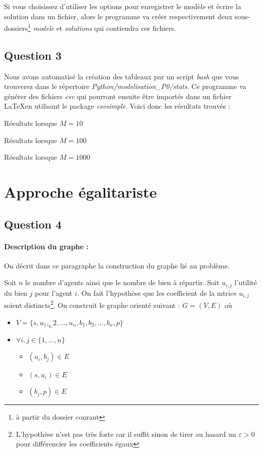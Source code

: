 \documentclass[a4paper, titlepage, oneside, 12pt]{article}%
\begin{document}
Si vous choisissez d'utiliser les options pour enregistrer le modèle et écrire la solution dans un fichier, alors le programme va créer respectivement deux sous-dossiers\footnote{à partir du dossier courant} \textit{modele} et \textit{solutions} qui contiendra ces fichiers.

\subsection{Question 3}

Nous avons automatisé la création des tableaux par un script \textit{bash} que vous trouverez dans le répertoire \textit{Python/modelisation\_P0/stats}. Ce programme va générer des fichiers \textit{csv} qui pourront ensuite être importés dans un fichier \LaTeX en utilisant le package \textit{csvsimple}. Voici donc les résultats trouvés :

\begin{table}
\caption{Résultats lorsque $M=10$}
\end{table}

\begin{table}
\caption{Résultats lorsque $M=100$}
\end{table}

\begin{table}
\caption{Résultats lorsque $M=1000$}
\end{table}
\section{Approche égalitariste}
\subsection{Question 4}
\paragraph{Description du graphe : } On décrit dans ce paragraphe la construction du graphe lié au problème. 

Soit $n$ le nombre d'agents ainsi que le nombre de bien à répartir. Soit $u_{i,j}$ l'utilité du bien $j$ pour l'agent $i$. 
On fait l'hypothèse que les coefficient de la mtrice $u_{i,j}$ soient distincts\footnote{L'hypothèse n'est pas très forte car il suffit sinon de tirer au hasard un $\varepsilon>0$ pour différencier les coefficients égaux}. 
On construit le graphe orienté suivant :
$G=(V,E)$ où 
\begin{itemize}
\item $V=\{s,u_1,_u2,\dots, u_n, b_1,b_2,\dots, b_n,p\}$
\item $\forall i,j \in \{1,\dots, n\} $
  \begin{itemize}
  \item $(u_i,b_j)\in E $
  \item $(s,u_i)\in E$
  \item $(b_j,p) \in E$
  \end{itemize}
\end{itemize}  
\end{document}
